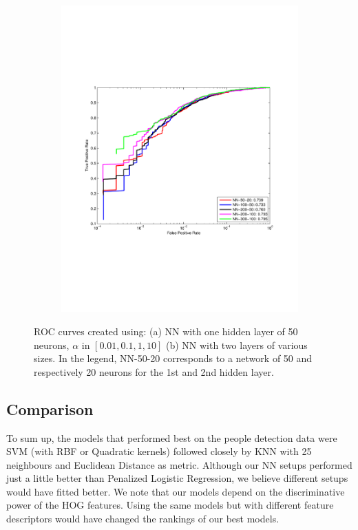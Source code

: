 \begin{figure}[h]
\begin{subfigure}[b]{0.49\textwidth}
    \includegraphics[width=\textwidth]{figures/NN-2layers.pdf}
    \caption{}
    \label{fig:NNb}
  \end{subfigure}
  \caption{ROC curves created using: (a) NN with one hidden layer of 50 neurons, $\alpha$ in $[0.01,0.1,1,10]$ (b) NN with two layers of various sizes. In the legend, NN-50-20 corresponds to a network of 50 and respectively 20  neurons for the 1st and 2nd hidden layer.}
\end{figure}

\subsection{Comparison}
To sum up, the models that performed best on the people detection data were SVM (with RBF or Quadratic kernels) followed closely by KNN with 25 neighbours and Euclidean Distance as metric. Although our NN setups performed just a little better than Penalized Logistic Regression, we believe different setups would have fitted better. 
We note that our models depend on the discriminative power of the HOG features. Using the same models but with different feature descriptors would have changed the rankings of our best models. 
